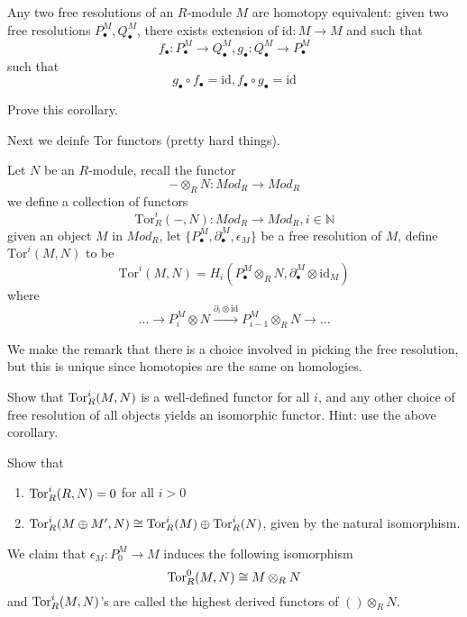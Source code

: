 \begin{cor}
    Any two free resolutions of an $R$-module $M$ are homotopy equivalent: given two free resolutions $P_\bullet^M, Q_\bullet^M$, there exists extension of $\text{id}: M\to M$ and such that 
    \begin{equation*}
        f_\bullet: P_\bullet^M\to Q_\bullet^M, g_\bullet: Q_\bullet^M\to P_\bullet^M
    \end{equation*}
    such that 
    \begin{equation*}
        g_\bullet\circ f_\bullet= \text{id}, f_\bullet\circ g_\bullet= \text{id}
    \end{equation*}
\end{cor}
\begin{prob}[HW(2.1)]
    Prove this corollary.
\end{prob}
Next we deinfe Tor functors (pretty hard things). 
\begin{defn}
    Let $N$ be an $R$-module, recall the functor 
    \begin{equation*}
        -\otimes_RN: Mod_R\to Mod_R
    \end{equation*}
    we define a collection of functors 
    \begin{equation*}
        \text{Tor}_R^i(-,N): Mod_R\to Mod_R, i\in\mathbb{N}
    \end{equation*}
    given an object $M$ in $Mod_R$, let $\{P_\bullet^M, \partial_\bullet^M, \epsilon_M\}$ be a free resolution of $M$, define $\text{Tor}^i(M,N)$ to be 
    \begin{equation*}
        \text{Tor}^i(M,N)=H_i(P_\bullet^M\otimes_RN, \partial_\bullet^M\otimes\text{id}_M)
    \end{equation*}
    where 
    \begin{equation*}
        \dots\to P_i^M\otimes N\xrightarrow{\partial_i\otimes\text{id}}P_{i-1}^M\otimes_RN\to\dots
    \end{equation*}
\end{defn}
We make the remark that there is a choice involved in picking the free resolution, but this is unique since homotopies are the same on homologies.
\begin{prob}[HW(2.2)]
    Show that $\text{Tor}_R^i(M,N)$ is a well-defined functor for all $i$, and any other choice of free resolution of all objects yields an isomorphic functor. Hint: use the above corollary.
\end{prob}
\begin{prob}[HW(2.3)]
    Show that 
    \begin{enumerate}
        \item $\text{Tor}_R^i(R,N)=0$ for all $i>0$
        \item $\text{Tor}_R^i(M\oplus M', N)\cong\text{Tor}_R^i(M)\oplus\text{Tor}_R^i(N)$, given by the natural isomorphism.
    \end{enumerate}
\end{prob}
We claim that $\epsilon_M:P_0^M\to M$ induces the following isomorphism
\begin{equation*}
    \text{Tor}_R^0(M,N)\cong M\otimes_RN
\end{equation*}
and $\text{Tor}_R^i(M,N)$'s are called the highest derived functors of $( )\otimes_RN$.


